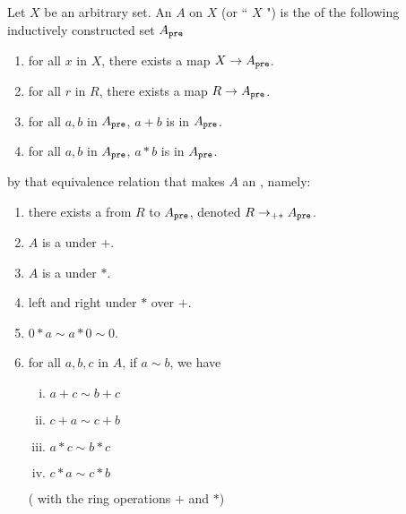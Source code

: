 \begin{definition}
    \label{FreeAlgebra}
    \leanok

    Let $X$ be an arbitrary set.
    An  $A$ on $X$ (or `` $X$ ") is the  of the following inductively constructed set $A_{\mathtt{pre}}$

    \begin{enumerate}

    \item for all $x$ in $X$, there exists a map $X \to A_{\mathtt{pre}}$.
    \item for all $r$ in $R$, there exists a map $R \to A_{\mathtt{pre}}$.
    \item for all $a, b$ in $A_{\mathtt{pre}}$, $a + b$ is in $A_{\mathtt{pre}}$.
    \item for all $a, b$ in $A_{\mathtt{pre}}$, $a * b$ is in $A_{\mathtt{pre}}$.
    
    \end{enumerate}

    by that equivalence relation that makes $A$ an , namely:

    \begin{enumerate}
    
    \item there exists a  from $R$ to $A_{\mathtt{pre}}$, denoted $R \to_{+*} A_{\mathtt{pre}}$.
    \item $A$ is a  under $+$.
    \item $A$ is a  under $*$.
    \item left and right  under $*$ over $+$.
    \item $0 * a \sim a * 0 \sim 0$.
    \item for all $a, b, c$ in $A$, if $a \sim b$, we have
    
    \begin{enumerate}[(i)]
    
    \item $a + c \sim b + c$
    \item $c + a \sim c + b$
    \item $a * c \sim b * c$
    \item $c * a \sim c * b$

    \end{enumerate}

    ( with the ring operations $+$ and $*$)

    \end{enumerate}

\end{definition}

